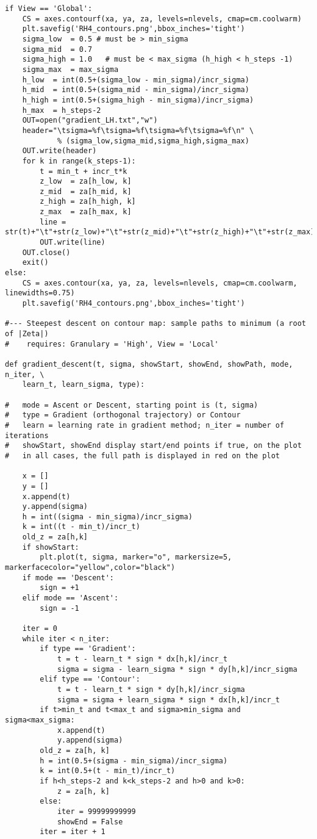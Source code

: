 \documentclass[oneside,10pt]{book}
\begin{document}
\begin{lstlisting}
if View == 'Global':
    CS = axes.contourf(xa, ya, za, levels=nlevels, cmap=cm.coolwarm)
    plt.savefig('RH4_contours.png',bbox_inches='tight')
    sigma_low  = 0.5 # must be > min_sigma
    sigma_mid  = 0.7
    sigma_high = 1.0   # must be < max_sigma (h_high < h_steps -1)
    sigma_max  = max_sigma
    h_low  = int(0.5+(sigma_low - min_sigma)/incr_sigma)
    h_mid  = int(0.5+(sigma_mid - min_sigma)/incr_sigma)
    h_high = int(0.5+(sigma_high - min_sigma)/incr_sigma)
    h_max  = h_steps-2
    OUT=open("gradient_LH.txt","w")
    header="\tsigma=%f\tsigma=%f\tsigma=%f\tsigma=%f\n" \
            % (sigma_low,sigma_mid,sigma_high,sigma_max)
    OUT.write(header)
    for k in range(k_steps-1):
        t = min_t + incr_t*k
        z_low  = za[h_low, k]
        z_mid  = za[h_mid, k]
        z_high = za[h_high, k]
        z_max  = za[h_max, k]
        line = str(t)+"\t"+str(z_low)+"\t"+str(z_mid)+"\t"+str(z_high)+"\t"+str(z_max)+"\n"
        OUT.write(line)
    OUT.close()
    exit()
else:
    CS = axes.contour(xa, ya, za, levels=nlevels, cmap=cm.coolwarm, linewidths=0.75)
    plt.savefig('RH4_contours.png',bbox_inches='tight')

#--- Steepest descent on contour map: sample paths to minimum (a root of |Zeta|)
#    requires: Granulary = 'High', View = 'Local'

def gradient_descent(t, sigma, showStart, showEnd, showPath, mode, n_iter, \
    learn_t, learn_sigma, type):

#   mode = Ascent or Descent, starting point is (t, sigma)
#   type = Gradient (orthogonal trajectory) or Contour
#   learn = learning rate in gradient method; n_iter = number of iterations
#   showStart, showEnd display start/end points if true, on the plot
#   in all cases, the full path is displayed in red on the plot

    x = []
    y = []
    x.append(t)
    y.append(sigma)
    h = int((sigma - min_sigma)/incr_sigma)
    k = int((t - min_t)/incr_t)
    old_z = za[h,k]
    if showStart:
        plt.plot(t, sigma, marker="o", markersize=5, markerfacecolor="yellow",color="black")
    if mode == 'Descent':
        sign = +1
    elif mode == 'Ascent':
        sign = -1

    iter = 0
    while iter < n_iter:
        if type == 'Gradient':
            t = t - learn_t * sign * dx[h,k]/incr_t
            sigma = sigma - learn_sigma * sign * dy[h,k]/incr_sigma
        elif type == 'Contour':
            t = t - learn_t * sign * dy[h,k]/incr_sigma
            sigma = sigma + learn_sigma * sign * dx[h,k]/incr_t
        if t>min_t and t<max_t and sigma>min_sigma and sigma<max_sigma:
            x.append(t)
            y.append(sigma)
        old_z = za[h, k]
        h = int(0.5+(sigma - min_sigma)/incr_sigma)
        k = int(0.5+(t - min_t)/incr_t)
        if h<h_steps-2 and k<k_steps-2 and h>0 and k>0:
            z = za[h, k]
        else:
            iter = 99999999999
            showEnd = False
        iter = iter + 1


\end{lstlisting}
\end{document}
